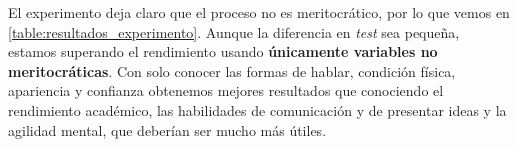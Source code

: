 \documentclass[11pt]{article}
\begin{document}
El experimento deja claro que el proceso no es meritocrático, por lo que vemos en \ref{table:resultados_experimento}. Aunque la diferencia en \textit{test} sea pequeña, estamos superando el rendimiento usando \textbf{únicamente variables no meritocráticas}. Con solo conocer las formas de hablar, condición física, apariencia y confianza obtenemos mejores resultados que conociendo el rendimiento académico, las habilidades de comunicación y de presentar ideas y la agilidad mental, que deberían ser mucho más útiles.

\newpage


\newpage

\pagebreak





\end{document}
